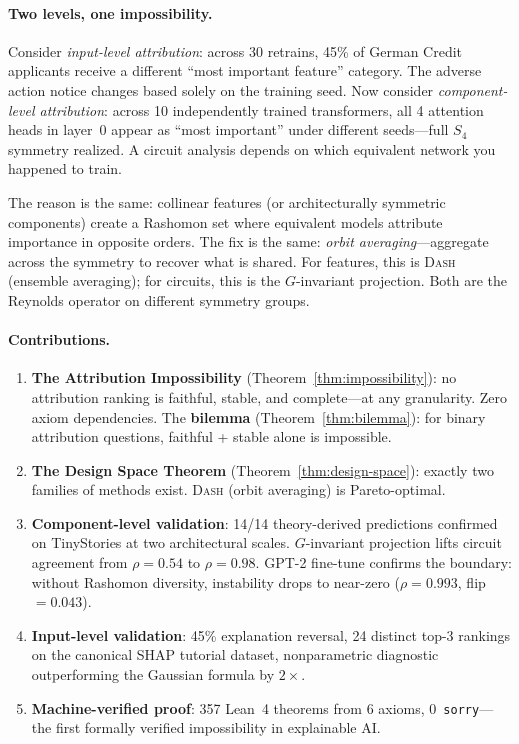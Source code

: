 \documentclass{article}
\newcommand{\DASH}{\textsc{Dash}}
\begin{document}
\paragraph{Two levels, one impossibility.}
Consider \emph{input-level attribution}: across 30 retrains, 45\% of German Credit applicants receive a different ``most important feature'' category. The adverse action notice changes based solely on the training seed.
Now consider \emph{component-level attribution}: across 10 independently trained transformers, all 4 attention heads in layer~0 appear as ``most important'' under different seeds---full $S_4$ symmetry realized. A circuit analysis depends on which equivalent network you happened to train.

The reason is the same: collinear features (or architecturally symmetric components) create a Rashomon set where equivalent models attribute importance in opposite orders. The fix is the same: \emph{orbit averaging}---aggregate across the symmetry to recover what is shared. For features, this is \DASH{} (ensemble averaging); for circuits, this is the $G$-invariant projection. Both are the Reynolds operator on different symmetry groups.

\paragraph{Contributions.}
\begin{enumerate}
    \item \textbf{The Attribution Impossibility} (Theorem~\ref{thm:impossibility}): no attribution ranking is faithful, stable, and complete---at any granularity. Zero axiom dependencies. The \textbf{bilemma} (Theorem~\ref{thm:bilemma}): for binary attribution questions, faithful + stable alone is impossible.
    \item \textbf{The Design Space Theorem} (Theorem~\ref{thm:design-space}): exactly two families of methods exist. \DASH{} (orbit averaging) is Pareto-optimal.
    \item \textbf{Component-level validation}: 14/14 theory-derived predictions confirmed on TinyStories at two architectural scales. $G$-invariant projection lifts circuit agreement from $\rho{=}0.54$ to $\rho{=}0.98$. GPT-2 fine-tune confirms the boundary: without Rashomon diversity, instability drops to near-zero ($\rho{=}0.993$, flip $= 0.043$).
    \item \textbf{Input-level validation}: 45\% explanation reversal, 24 distinct top-3 rankings on the canonical SHAP tutorial dataset, nonparametric diagnostic outperforming the Gaussian formula by $2\times$.
    \item \textbf{Machine-verified proof}: 357 Lean~4 theorems from 6 axioms, 0~\texttt{sorry}---the first formally verified impossibility in explainable AI.
\end{enumerate}
\end{document}
